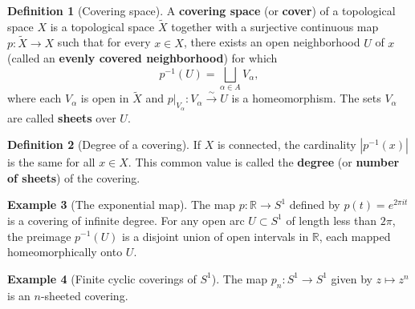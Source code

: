 \documentclass[12pt,a4paper,openany]{book}
\theoremstyle{definition}
\newtheorem{definition}{Definition}[chapter]
\newtheorem{example}[definition]{Example}
\theoremstyle{plain}
\theoremstyle{remark}
\newcommand{\R}{\mathbb{R}}
\newcommand{\abs}[1]{\left|#1\right|}
\begin{document}
\begin{definition}[Covering space]\label{def:covering}
  A \textbf{covering space} (or \textbf{cover}) of a topological space $X$
  is a topological space $\widetilde{X}$ together with a surjective continuous
  map $p\colon \widetilde{X} \to X$ such that for every $x \in X$, there
  exists an open neighborhood $U$ of $x$ (called an
  \textbf{evenly covered neighborhood})
  for which
  \[
    p^{-1}(U) = \bigsqcup_{\alpha \in A} V_\alpha,
  \]
  where each $V_\alpha$ is open in $\widetilde{X}$ and
  $p|_{V_\alpha}\colon V_\alpha \xrightarrow{\;\sim\;} U$ is a homeomorphism.
  The sets $V_\alpha$ are called \textbf{sheets} over
  $U$.
\end{definition}

\begin{definition}[Degree of a covering]\label{def:covering-degree}
  If $X$ is connected, the cardinality $\abs{p^{-1}(x)}$ is the same for all
  $x \in X$.  This common value is called the \textbf{degree} (or
  \textbf{number of sheets}) of the covering.
\end{definition}

\begin{example}[The exponential map]\label{ex:exp-covering}
  The map $p\colon \R \to S^1$ defined by $p(t) = e^{2\pi i t}$ is a
  covering of infinite degree.  For any open arc $U \subset S^1$ of length
  less than $2\pi$, the preimage $p^{-1}(U)$ is a disjoint union of open
  intervals in $\R$, each mapped homeomorphically onto $U$.

  \begin{center}
  \end{center}
\end{example}

\begin{example}[Finite cyclic coverings of $S^1$]\label{ex:cyclic-covering-S1}
  The map $p_n\colon S^1 \to S^1$ given by $z \mapsto z^n$ is an $n$-sheeted
  covering.
\end{example}
\end{document}
